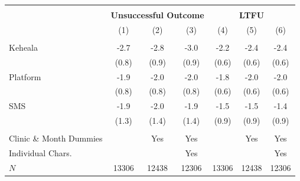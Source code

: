 \scriptsize{
\begin{tabular}{l*{6}{c}}
\hline\hline \\[-8pt]
 & \multicolumn{3}{c}{\textbf{Unsuccessful Outcome}} & \multicolumn{3}{c}{\textbf{LTFU}} \\
\rowcolor{yellow!15}            &\multicolumn{1}{c}{(1)}&\multicolumn{1}{c}{(2)}&\multicolumn{1}{c}{(3)}&\multicolumn{1}{c}{(4)}&\multicolumn{1}{c}{(5)}&\multicolumn{1}{c}{(6)}\\
\hline \\[-8pt]
Keheala & -2.7\sym{**} & -2.8\sym{***} & -3.0\sym{***} & -2.2\sym{***} & -2.4\sym{***} & -2.4\sym{***} \\
            &   (0.8) &   (0.9) &   (0.9) &   (0.6) &   (0.6) &   (0.6)         \\
[0.4em]
Platform & -1.9\sym{*} & -2.0\sym{*} & -2.0\sym{*} & -1.8\sym{**} & -2.0\sym{***} & -2.0\sym{***} \\
            &   (0.8) &   (0.8) &   (0.8) &   (0.6) &   (0.6) &   (0.6)         \\
[0.4em]
SMS & -1.9 & -2.0 & -1.9 & -1.5 & -1.5 & -1.4 \\
            &   (1.3) &   (1.4) &   (1.4) &   (0.9) &   (0.9) &   (0.9)         \\
[0.4em]
\hline
\hline \\[-8pt]
Clinic \& Month Dummies & & Yes & Yes & & Yes & Yes \\
Individual Chars. & & & Yes & & & Yes \\
\(N\)       &       13306         &       12438         &       12306         &       13306         &       12438         &       12306         \\
\hline\hline
\end{tabular}
}
